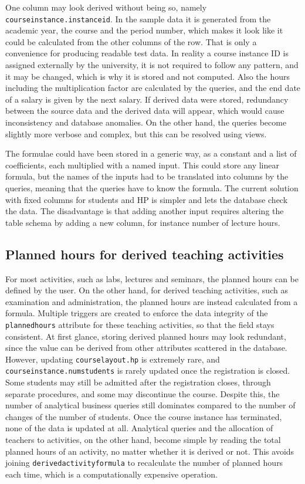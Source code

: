 \documentclass[a4paper]{scrartcl}
\renewcommand{\_}{\textunderscore\allowbreak}
\begin{document}
One column may look derived without being so, namely \texttt{course\_instance.instance\_id}. In the sample data it is generated from the academic year, the course and the period number, which makes it look like it could be calculated from the other columns of the row. That is only a convenience for producing readable test data. In reality a course instance ID is assigned externally by the university, it is not required to follow any pattern, and it may be changed, which is why it is stored and not computed. Also the hours including the multiplication factor are calculated by the queries, and the end date of a salary is given by the next salary. If derived data were stored, redundancy between the source data and the derived data will appear, which would cause inconsistency and database anomalies. On the other hand, the queries become slightly more verbose and complex, but this can be resolved using views.

The formulae could have been stored in a generic way, as a constant and a list of coefficients, each multiplied with a named input. This could store any linear formula, but the names of the inputs had to be translated into columns by the queries, meaning that the queries have to know the formula. The current solution with fixed columns for students and HP is simpler and lets the database check the data. The disadvantage is that adding another input requires altering the table schema by adding a new column, for instance number of lecture hours.

\subsection{Planned hours for derived teaching activities}
For most activities, such as labs, lectures and seminars, the planned hours can be defined by the user. On the other hand, for derived teaching activities, such as examination and administration, the planned hours are instead calculated from a formula. Multiple triggers are created to enforce the data integrity of the \texttt{planned\_hours} attribute for these teaching activities, so that the field stays consistent. At first glance, storing derived planned hours may look redundant, since the value can be derived from other attributes scattered in the database. However, updating \texttt{course\_layout.hp} is extremely rare, and \texttt{course\_instance.num\_students} is rarely updated once the registration is closed. Some students may still be admitted after the registration closes, through separate procedures, and some may discontinue the course. Despite this, the number of analytical business queries still dominates compared to the number of changes of the number of students. Once the course instance has terminated, none of the data is updated at all. Analytical queries and the allocation of teachers to activities, on the other hand, become simple by reading the total planned hours of an activity, no matter whether it is derived or not. This avoids joining \texttt{derived\_activity\_formula} to recalculate the number of planned hours each time, which is a computationally expensive operation.
\end{document}
